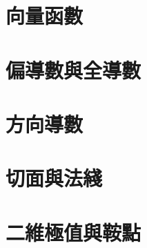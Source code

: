 \documentclass[12pt]{article}
\begin{document}
    \section*{向量函數}

    \section*{偏導數與全導數}

    \section*{方向導數}

    \section*{切面與法綫}

    \section*{二維極值與鞍點}
\end{document}
